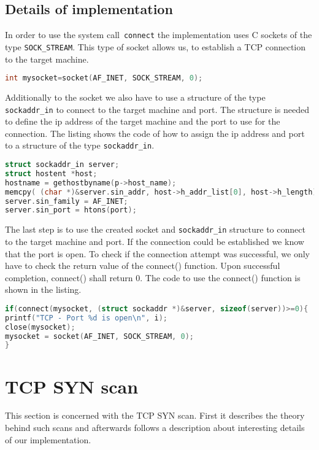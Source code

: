 \subsection{Details of implementation}
In order to use the system call~\lstinline{connect} the implementation uses C sockets of the type \lstinline|SOCK_STREAM|. This type
of socket allows us, to establish a TCP connection to the target machine.
\begin{lstlisting}[frame= single, language=C, caption=C code to create a TCP socket in C]
int mysocket=socket(AF_INET, SOCK_STREAM, 0);
\end{lstlisting}
Additionally to the socket we also have to use a structure of the type \lstinline|sockaddr_in| to connect to the target machine and port.
The structure is needed to define the ip address of the target machine and the port to use for the connection. The listing shows the
code of how to assign the ip address and port to a structure of the type \lstinline|sockaddr_in|. 
\begin{lstlisting}[frame= single, language=C, caption= C code to use the structure \lstinline|sockaddr_in|]
struct sockaddr_in server;
struct hostent *host;
hostname = gethostbyname(p->host_name);
memcpy( (char *)&server.sin_addr, host->h_addr_list[0], host->h_length);
server.sin_family = AF_INET;
server.sin_port = htons(port);
\end{lstlisting}
The last step is to use the created socket and  \lstinline|sockaddr_in| structure to connect to the target machine and port. If the 
connection could be established we know that the port is open. To check if the connection attempt was successful, we only have to
check the return value of the connect() function. Upon successful completion, connect() shall return 0. The code to use the connect() function is shown in the listing.
\begin{lstlisting}[frame= single, language=C, caption= C code to use the connect() to check if port is open]
if(connect(mysocket, (struct sockaddr *)&server, sizeof(server))>=0){
printf("TCP - Port %d is open\n", i);
close(mysocket);
mysocket = socket(AF_INET, SOCK_STREAM, 0);
}
\end{lstlisting}

\section{TCP SYN scan}
\label{sec:syn}
This section is concerned with the TCP SYN scan. First it describes the theory behind such scans and afterwards follows a description about interesting details of our implementation.
